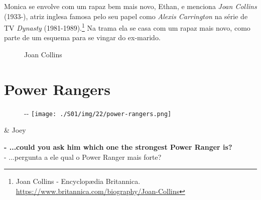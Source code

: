 \saveparinfos
\noindent
\begin{minipage}[c]{0.5\textwidth}\useparinfo

Monica se envolve com um rapaz bem mais novo, Ethan, e menciona
\emph{Joan Collins} (1933-), atriz inglesa famosa pelo seu papel como
\emph{Alexis Carrington} na série de TV \emph{Dynasty}
(1981-1989).\footnote{\sloppy Joan Collins - Encyclopædia Britannica. \url{https://www.britannica.com/biography/Joan-Collins}}
Na trama ela se casa com um rapaz mais novo, como parte de um esquema
para se vingar do ex-marido.

\end{minipage}\hfill
\begin{minipage}[c]{0.5\textwidth}

\begin{figure}
  \centering
    \caption{Joan Collins\label{fig:joan-collins}}
\end{figure}

\end{minipage}

\hypertarget{power-rangers}{%
\section{Power Rangers}\label{power-rangers}}

\begin{figure}[!ht]
  \begin{adjustwidth}{-\oddsidemargin-1in}{-\rightmargin}
    \centering
    \texttt{[image: ./S01/img/22/power-rangers.png]}
  \end{adjustwidth}
\end{figure}

\begin{tcolorbox}[enhanced,center upper,
    drop fuzzy shadow southeast, boxrule=0.3pt,
    lower separated=false, breakable,
    colframe=black!30!dialogoBorder,colback=white]
\begin{minipage}[c]{0.16\linewidth}
   & \centering \scriptsize{Joey}
\end{minipage}
\hfill
\begin{minipage}[c]{0.8\linewidth}
  \textbf{- ...could you ask him which one the strongest Power Ranger is?}\\
  - ...pergunta a ele qual o Power Ranger mais forte?
\end{minipage}
\end{tcolorbox}

